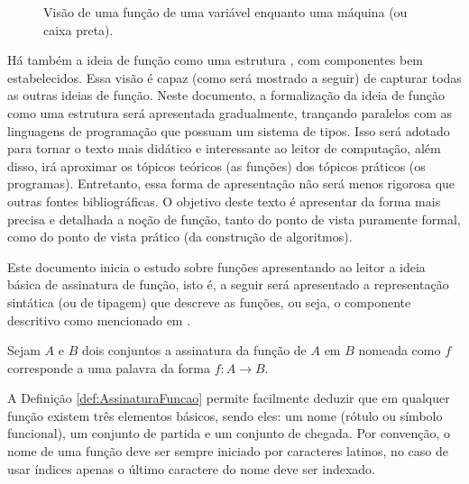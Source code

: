 \begin{figure}[h]
	\centering
	\caption{Visão de uma função de uma variável enquanto uma máquina (ou caixa preta).}
	\label{fig:FuncaoBlackBox}
\end{figure}

Há também a ideia de função como uma estrutura \cite{judith2021}, com componentes bem estabelecidos. Essa visão é capaz (como será mostrado a seguir) de capturar todas as outras ideias de função.  Neste documento, a formalização da ideia de função como uma estrutura será apresentada gradualmente, trançando paralelos com as linguagens de programação que possuam um sistema de tipos. Isso será adotado para tornar o texto mais didático e interessante ao leitor de computação, além disso, irá aproximar os tópicos teóricos (as funções) dos tópicos práticos (os programas). Entretanto, essa forma de apresentação não será menos rigorosa que outras fontes bibliográficas. O objetivo deste texto é apresentar da forma mais precisa e detalhada a noção de função, tanto do ponto de vista puramente formal, como do ponto de vista prático (da construção de algoritmos).

Este documento inicia o estudo sobre funções apresentando ao leitor a ideia básica de assinatura de função, isto é, a seguir será apresentado a representação sintática (ou de tipagem) que descreve as funções, ou seja, o componente descritivo como mencionado em \cite{levin2021}.

\begin{definicao}\label{def:AssinaturaFuncao}
	Sejam $A$ e $B$ dois conjuntos a assinatura da função de $A$ em $B$ nomeada como $f$ corresponde a uma palavra da forma $f: A \rightarrow B$.
\end{definicao}

A Definição \ref{def:AssinaturaFuncao} permite facilmente deduzir que em qualquer função existem três elementos básicos, sendo eles: um nome (rótulo ou símbolo funcional), um conjunto de partida e um conjunto de chegada. Por convenção, o nome de uma função deve ser sempre iniciado por caracteres latinos, no caso de usar índices apenas o último caractere do nome deve ser indexado.

